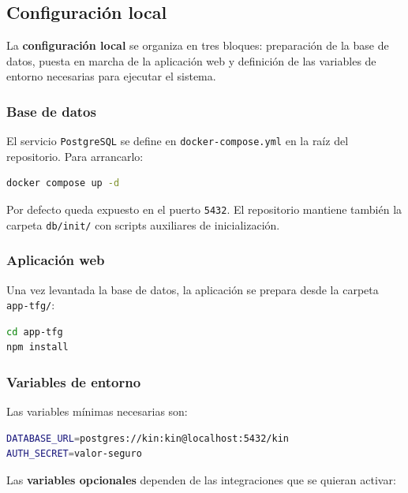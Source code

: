 \subsection{Configuración local}

La \textbf{configuración local} se organiza en tres bloques: preparación de la base de datos, puesta en marcha de la aplicación web y definición de las variables de entorno necesarias para ejecutar el sistema.

\subsubsection*{Base de datos}

El servicio \texttt{PostgreSQL} se define en \texttt{docker-compose.yml} en la raíz del repositorio. Para arrancarlo:

\begin{lstlisting}[language=bash]
docker compose up -d
\end{lstlisting}

Por defecto queda expuesto en el puerto \texttt{5432}. El repositorio mantiene también la carpeta \texttt{db/init/} con scripts auxiliares de inicialización.

\subsubsection*{Aplicación web}

Una vez levantada la base de datos, la aplicación se prepara desde la carpeta \texttt{app-tfg/}:

\begin{lstlisting}[language=bash]
cd app-tfg
npm install
\end{lstlisting}

\subsubsection*{Variables de entorno}

Las variables mínimas necesarias son:

\begin{lstlisting}[language=bash]
DATABASE_URL=postgres://kin:kin@localhost:5432/kin
AUTH_SECRET=valor-seguro
\end{lstlisting}

Las \textbf{variables opcionales} dependen de las integraciones que se quieran activar:

